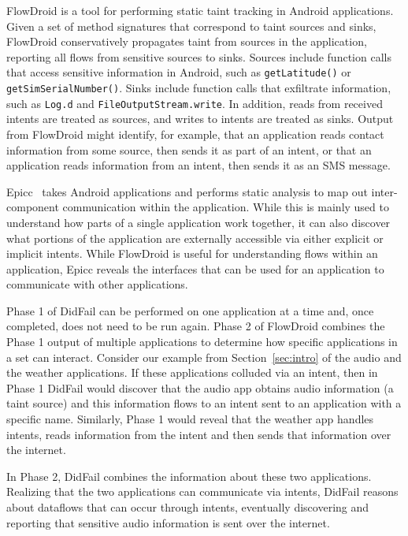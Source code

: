 FlowDroid is a tool for performing static taint tracking in Android applications. Given a set of method signatures that correspond to taint sources and sinks, FlowDroid conservatively propagates taint from sources in the application, reporting all flows from sensitive sources to sinks. Sources include function calls that access sensitive information in Android, such as \texttt{getLatitude()} or \texttt{getSimSerialNumber()}. Sinks include function calls that exfiltrate information, such as \texttt{Log.d} and \texttt{FileOutputStream.write}. In addition, reads from received intents are treated as sources, and writes to intents are treated as sinks. Output from FlowDroid might identify, for example, that an application reads contact information from some source, then sends it as part of an intent, or that an application reads information from an intent, then sends it as an SMS message.

Epicc~\cite{epicc} takes Android applications and performs static analysis to map out inter-component communication within the application. While this is mainly used to understand how parts of a single application work together, it can also discover what portions of the application are externally accessible via either explicit or implicit intents. While FlowDroid is useful for understanding flows within an application, Epicc reveals the interfaces that can be used for an application to communicate with other applications.

Phase 1 of DidFail can be performed on one application at a time and, once completed, does not need to be run again. Phase 2 of FlowDroid combines the Phase 1 output of multiple applications to determine how specific applications in a set can interact. Consider our example from Section~\ref{sec:intro} of the audio and the weather applications. If these applications colluded via an intent, then in Phase 1 DidFail would discover that the audio app obtains audio information (a taint source) and this information flows to an intent sent to an application with a specific name. Similarly, Phase 1 would reveal that the weather app handles intents, reads information from the intent and then sends that information over the internet. 

In Phase 2, DidFail combines the information about these two applications. Realizing that the two applications can communicate via intents, DidFail reasons about dataflows that can occur through intents, eventually discovering and reporting that sensitive audio information is sent over the internet. 

